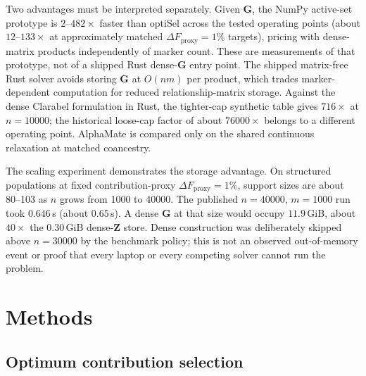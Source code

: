 \documentclass[11pt]{article}
\newcommand{\bG}{\mathbf{G}}
\newcommand{\bZ}{\mathbf{Z}}
\begin{document}
Two advantages must be interpreted separately. Given $\bG$, the NumPy active-set prototype is $2$--$482\times$ faster than optiSel across the tested operating points (about $12$--$133\times$ at approximately matched $\Delta F_{\mathrm{proxy}}=1\%$ targets), pricing with dense-matrix products independently of marker count. These are measurements of that prototype, not of a shipped Rust dense-$\bG$ entry point. The shipped matrix-free Rust solver avoids storing $\bG$ at $O(nm)$ per product, which trades marker-dependent computation for reduced relationship-matrix storage. Against the dense Clarabel formulation in Rust, the tighter-cap synthetic table gives $716\times$ at $n=10000$; the historical loose-cap factor of about $76000\times$ belongs to a different operating point. AlphaMate is compared only on the shared continuous relaxation at matched coancestry.

The scaling experiment demonstrates the storage advantage. On structured populations at fixed contribution-proxy $\Delta F_{\mathrm{proxy}}=1\%$, support sizes are about 80--103 as $n$ grows from 1000 to 40000. The published $n=40000$, $m=1000$ run took $0.646$\,s (about $0.65$\,s). A dense $\bG$ at that size would occupy $11.9$\,GiB, about $40\times$ the $0.30$\,GiB dense-$\bZ$ store. Dense construction was deliberately skipped above $n=30000$ by the benchmark policy; this is not an observed out-of-memory event or proof that every laptop or every competing solver cannot run the problem.

\section{Methods}

\subsection{Optimum contribution selection}
\end{document}

